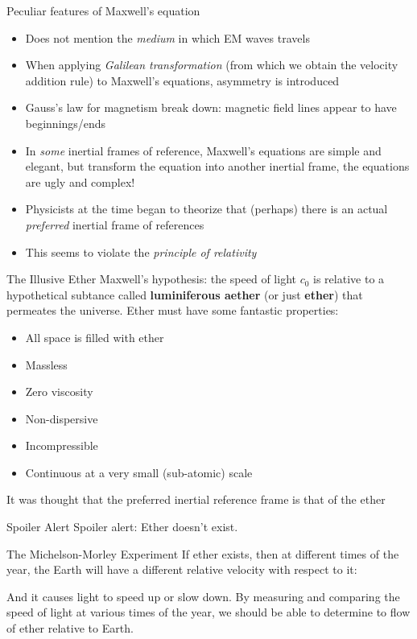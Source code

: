 \documentclass[12pt,compress,aspectratio=169]{beamer}
\begin{document}
\begin{frame}{Peculiar features of Maxwell's equation}
  \begin{itemize}
  \item Does not mention the \emph{medium} in which EM waves travels
  \item When applying \emph{Galilean transformation} (from which we obtain
    the velocity addition rule) to Maxwell's equations, asymmetry is introduced
  \item Gauss's law for magnetism break down: magnetic field lines appear to
    have beginnings/ends
  \item In \emph{some} inertial frames of reference, Maxwell's equations are
    simple and elegant, but transform the equation into another inertial frame,
    the equations are ugly and complex!
  \item Physicists at the time began to theorize that (perhaps) there is an
    actual \emph{preferred} inertial frame of references
  \item This seems to violate the \emph{principle of relativity}
  \end{itemize}
\end{frame}



\begin{frame}{The Illusive Ether}
  Maxwell's hypothesis: the speed of light $c_0$ is relative to a hypothetical
  subtance called \textbf{luminiferous aether} (or just \textbf{ether}) that
  permeates the universe. Ether must have some fantastic properties:
  \begin{itemize}
  \item All space is filled with ether
  \item Massless
  \item Zero viscosity
  \item Non-dispersive
  \item Incompressible
  \item Continuous at a very small (sub-atomic) scale
  \end{itemize}
  It was thought that the preferred inertial reference frame is that of the
  ether
\end{frame}



\begin{frame}{Spoiler Alert}
  Spoiler alert: Ether doesn't exist.
\end{frame}



\begin{frame}{The Michelson-Morley Experiment}
  If ether exists, then at different times of the year, the Earth will have a
  different relative velocity with respect to it:
  \begin{center}
  \end{center}
  And it causes light to speed up or slow down. By measuring and comparing the
  speed of light at various times of the year, we should be able to determine
  to flow of ether relative to Earth.
\end{frame}
\end{document}

